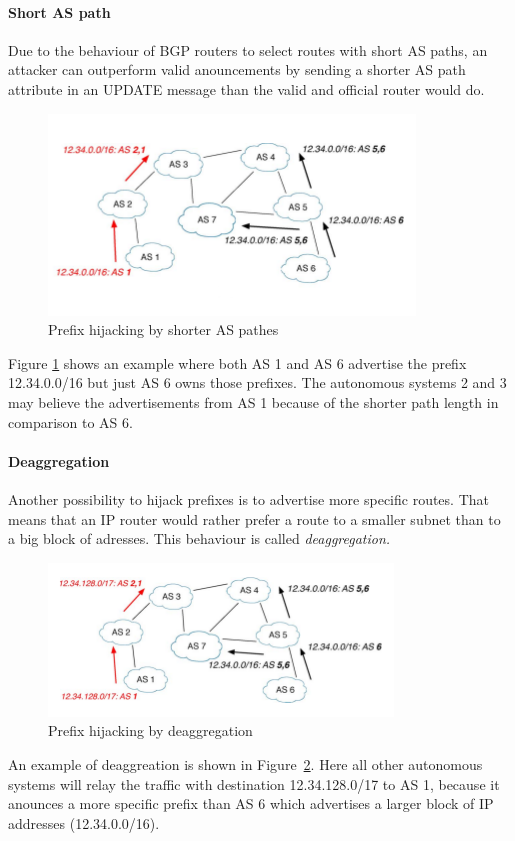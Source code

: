\documentclass[12pt]{IEEEtran}
\begin{document}
		\paragraph{Short AS path}
		Due to the behaviour of BGP routers to select routes with short AS paths, an attacker can outperform valid anouncements by sending a shorter AS path attribute in an UPDATE message than the valid and official router would do. 
		\begin{figure}[h]
			\includegraphics[scale=1]{pathlength1.png}
			\caption{Prefix hijacking by shorter AS pathes}
			\label{shortpath}
		\end{figure}
		Figure \ref{shortpath} shows an example where both AS 1 and AS 6 advertise the prefix 12.34.0.0/16 but just AS 6 owns those prefixes. The autonomous systems 2 and 3 may believe the advertisements from AS 1 because of the shorter path length in comparison to AS 6.

		\paragraph{Deaggregation}
		Another possibility to hijack prefixes is to advertise more specific routes. That means that an IP router would rather prefer a route to a smaller subnet than to a big block of adresses. This behaviour is called \emph{deaggregation.} 
		
		\begin{figure}[h]
			\includegraphics[scale=1]{deaggregation.png}
			\caption{Prefix hijacking by deaggregation}
			\label{deaggregation}
		\end{figure}
		An example of deaggreation is shown in \mbox{Figure \ref{deaggregation}}. Here all other autonomous systems will relay the traffic with destination 12.34.128.0/17 to AS 1, because it anounces a more specific prefix than AS 6 which advertises a larger block of IP addresses (12.34.0.0/16).
		
\end{document}
